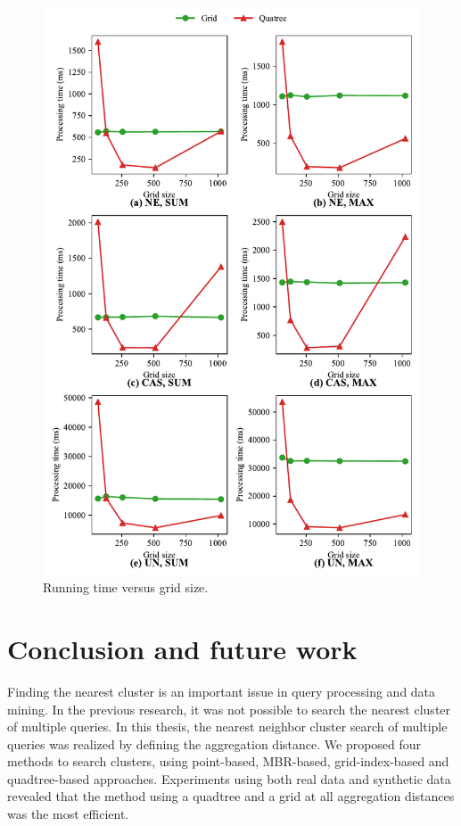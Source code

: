 \documentclass[a4paper,11pt]{report}
\theoremstyle{mytheoremstyle}
\begin{document}
\begin{figure}
    \begin{center}
        \includegraphics[width=\textwidth]{matplotlib/export/gridsize.pdf}
    \end{center}
    \caption{Running time versus grid size.}
    \label{fig:gridSize}
\end{figure}

\chapter{Conclusion and future work}
\label{section:conclusion}

Finding the nearest cluster is an important issue in query processing and data mining. In the previous research, it was not possible to search the nearest cluster of multiple queries. In this thesis, the nearest neighbor cluster search of multiple queries was realized by defining the aggregation distance. We proposed four methods to search clusters, using point-based, MBR-based, grid-index-based and quadtree-based approaches. Experiments using both real data and synthetic data revealed that the method using a quadtree and a grid at all aggregation distances was the most efficient.
\end{document}
